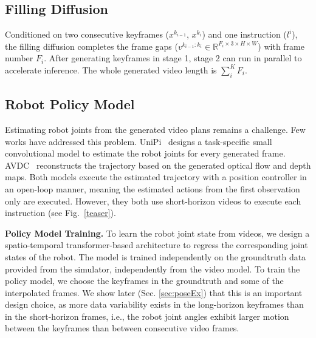 \documentclass[letterpaper, 10 pt, conference]{ieeeconf}  %
\begin{document}




\subsection{Filling Diffusion}
\label{sec:fd}
Conditioned on two consecutive keyframes ($x^{k_{i-1}}$, $x^{k_{i}}$) and one instruction ($l^i$), the filling diffusion completes the frame gaps ($v^{k_{i-1}:k_{i}} \in \mathbb{R}^{  F_i \times 3 \times H \times W}$) with frame number $F_i$. After generating keyframes in stage 1, stage 2 can run in parallel to accelerate inference. The whole generated video length is $\sum\limits_{i}^{K} F_i$. %

\subsection{Robot Policy Model}
\label{sec:policy}
Estimating robot joints from the generated video plans remains a challenge. Few works have addressed this problem. UniPi~\cite{unipi} designs a task-specific small convolutional model to estimate the robot joints for every generated frame. AVDC~\cite{avdc} reconstructs the trajectory based on the generated optical flow and depth maps. Both models execute the estimated trajectory with a position controller in an open-loop manner, meaning the estimated actions from the first observation only are executed. However, they both use short-horizon videos to execute each instruction (see Fig.~\ref{teaser}).


\noindent\textbf{Policy Model Training.} To learn the robot joint state from videos, we design a spatio-temporal transformer-based architecture to regress the corresponding joint states of the robot. The model is trained independently on the groundtruth data provided from the simulator, independently from the video model. To train the policy model, we choose the keyframes in the groundtruth and some of the interpolated frames. We show later (Sec. \ref{sec:poseEx}) that this is an important design choice, as more data variability exists in the long-horizon keyframes than in the short-horizon frames, i.e., the robot joint angles exhibit larger motion between the keyframes than between consecutive video frames.
\end{document}
